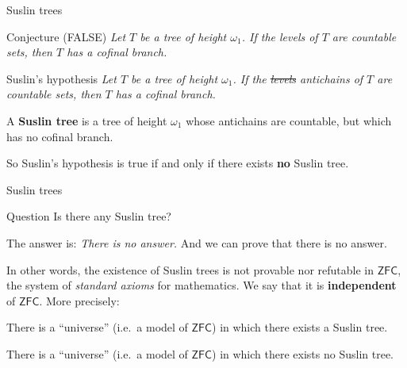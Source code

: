 \documentclass{beamer}
\theoremstyle{num.custom-title}
\theoremstyle{custom-title}
\newcommand{\ZFC}{\ensuremath{\mathsf{ZFC}}\xspace}
\renewcommand{\emph}[1]{\textbf{#1}}
\begin{document}
\begin{frame}{Suslin trees}

\begin{block}{Conjecture (FALSE)}
\textit{Let $T$ be a tree of height $\omega_1$. If the levels of $T$ are countable sets, then $T$ has a cofinal branch.}
\end{block}

\pause

\begin{block}{Suslin's hypothesis}
\textit{Let $T$ be a tree of height $\omega_1$. If the \sout{levels} antichains of $T$ are countable sets, then $T$ has a cofinal branch.}
\end{block}

\pause

\begin{definition}
A \emph{Suslin tree} is a tree of height $\omega_1$ whose antichains are countable, but which has no cofinal branch.
\end{definition}

\pause

So Suslin's hypothesis is true if and only if there exists \emph{no} Suslin tree.

\end{frame}


\begin{frame}{Suslin trees}

\begin{exampleblock}{Question}
Is there any Suslin tree?
\end{exampleblock}

The answer is: \pause \textit{There is no answer.} \pause And we can prove that there is no answer. \pause

In other words, the existence of Suslin trees is not provable nor refutable in \ZFC, the system of \textit{standard axioms} for mathematics. We say that it is \emph{independent} of \ZFC. More precisely:

\begin{theorem}[Tennenbaum, 1963]
There is a ``universe'' (i.e.\ a model of \ZFC) in which there exists a Suslin tree.
\end{theorem}

\begin{theorem}
There is a ``universe'' (i.e.\ a model of \ZFC) in which there exists no Suslin tree.
\end{theorem}

\end{frame}
\end{document}
